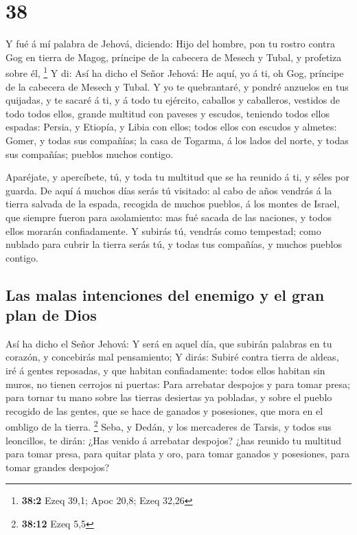 \hypertarget{section-37}{%
\section{38}\label{section-37}}

 Y fué á mí palabra de Jehová, diciendo: 
Hijo del hombre, pon tu rostro contra Gog en tierra de Magog, príncipe
de la cabecera de Mesech y Tubal, y profetiza sobre él, \footnote{\textbf{38:2}
  Ezeq 39,1; Apoc 20,8; Ezeq 32,26}  Y di: Así ha dicho el
Señor Jehová: He aquí, yo á ti, oh Gog, príncipe de la cabecera de
Mesech y Tubal.  Y yo te quebrantaré, y pondré anzuelos en
tus quijadas, y te sacaré á ti, y á todo tu ejército, caballos y
caballeros, vestidos de todo todos ellos, grande multitud con paveses y
escudos, teniendo todos ellos espadas:  Persia, y Etiopía,
y Libia con ellos; todos ellos con escudos y almetes: 
Gomer, y todas sus compañías; la casa de Togarma, á los lados del norte,
y todas sus compañías; pueblos muchos contigo.

 Aparéjate, y apercíbete, tú, y toda tu multitud que se ha
reunido á ti, y séles por guarda.  De aquí á muchos días
serás tú visitado: al cabo de años vendrás á la tierra salvada de la
espada, recogida de muchos pueblos, á los montes de Israel, que siempre
fueron para asolamiento: mas fué sacada de las naciones, y todos ellos
morarán confiadamente.  Y subirás tú, vendrás como
tempestad; como nublado para cubrir la tierra serás tú, y todas tus
compañías, y muchos pueblos contigo.

\hypertarget{las-malas-intenciones-del-enemigo-y-el-gran-plan-de-dios}{%
\subsection{Las malas intenciones del enemigo y el gran plan de
Dios}\label{las-malas-intenciones-del-enemigo-y-el-gran-plan-de-dios}}

 Así ha dicho el Señor Jehová: Y será en aquel día, que
subirán palabras en tu corazón, y concebirás mal pensamiento;
 Y dirás: Subiré contra tierra de aldeas, iré á gentes
reposadas, y que habitan confiadamente: todos ellos habitan sin muros,
no tienen cerrojos ni puertas:  Para arrebatar despojos y
para tomar presa; para tornar tu mano sobre las tierras desiertas ya
pobladas, y sobre el pueblo recogido de las gentes, que se hace de
ganados y posesiones, que mora en el ombligo de la tierra. \footnote{\textbf{38:12}
  Ezeq 5,5}  Seba, y Dedán, y los mercaderes de Tarsis, y
todos sus leoncillos, te dirán: ¿Has venido á arrebatar despojos? ¿has
reunido tu multitud para tomar presa, para quitar plata y oro, para
tomar ganados y posesiones, para tomar grandes despojos?


